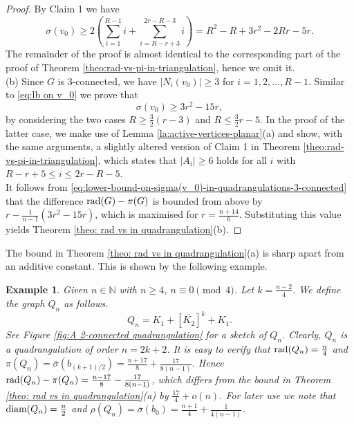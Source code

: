 \documentclass[a4paper,11pt]{article}
\newtheorem{example}{Example}[section]
\begin{document}
\begin{proof}
By Claim 1 we have 
\[ \sigma(v_0) 
  \geq 2\left( \sum_{i=1}^{R-1}i+\sum_{i=R-r+3}^{2r-R-3}i\right) 
   = R^2-R+3r^2-2Rr-5r. \]
The remainder of the proof is almost identical to the corresponding part of the proof of 
Theorem \ref{theo:rad-vs-pi-in-triangulation}, hence we omit it. \\[1mm]
(b) Since $G$ is $3$-connected, we have $|N_i(v_0)| \geq 3$ for $i=1,2,\ldots,R-1$. 
Similar to \eqref{eq:lb on v_0} we prove that 
\begin{equation}  \label{eq:lower-bound-on-sigma(v_0)-in-quadrangulations-3-connected} 
\sigma(v_0) \geq 3r^2 - 15r, 
\end{equation}
by considering the two cases $R \geq \frac{3}{2}(r-3)$ and $R \leq \frac{3}{2}r-5$. 
In the proof of the latter case, we make use of Lemma \ref{la:active-vertices-planar}(a) 
and show, with the same arguments, a slightly altered version of Claim 1 in 
Theorem \ref{theo:rad-vs-pi-in-triangulation}, which states that $|A_i| \geq 6$ holds
for all $i$ with $R-r+5 \leq i \leq 2r-R-5$. \\
It follows from  \eqref{eq:lower-bound-on-sigma(v_0)-in-quadrangulations-3-connected} that
the difference ${\rm rad}(G) - \pi(G)$ is bounded from above by $r - \frac{1}{n-1}(3r^2 - 15r)$,
which is maximised for $r=\frac{n+14}{6}$. Substituting this value yields 
Theorem \ref{theo: rad vs in quadrangulation}(b). 
\end{proof}




  
The bound in Theorem \ref{theo: rad vs in quadrangulation}(a) is sharp apart from an additive 
constant. This is shown by the following example.   
  

\begin{example}\label{exa:quadrangulation}
Given $n\in \mathbb{N}$ with $n\geq 4$, $n \equiv 0 \pmod{4}$. Let $k= \frac{n-2}{4}$. We define the graph $Q_n$ as follows. 
\[ Q_n = K_1 + [\overline{K_{2}}]^{k} + K_1.\]
See Figure \ref{fig:A 2-connected quadrangulation} for a sketch of $Q_n$. 
Clearly, $Q_n$ is a quadrangulation of order $n=2k+2$. It is easy to verify that
${\rm rad}(Q_n) = \frac{n}{4}$ and 
$\pi(Q_n) = \overline{\sigma}(b_{(k+1)/2}) = \frac{n+17}{8} + \frac{17}{8(n-1)}$.
Hence ${\rm rad}(Q_n) - \pi(Q_n) = \frac{n-17}{8} - \frac{17}{8(n-1)}$, which differs from
the bound in Theorem \ref{theo: rad vs in quadrangulation}(a) by $\frac{17}{4} +o(n)$.
For later use  we note that 
${\rm diam}(Q_n) = \frac{n}{2}$ and 
$\rho(Q_n) = \overline{\sigma}(b_0) = \frac{n+1}{4} + \frac{1}{4(n-1)}$.
\end{example}
  
\end{document}
